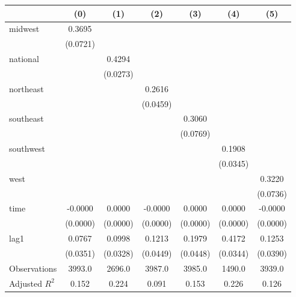 \begin{tabular}{lcccccc}
\toprule
 & (0) & (1) & (2) & (3) & (4) & (5) \\
\midrule
midwest & 0.3695 &  &  &  &  &  \\
\vspace{0.2cm}
 & (0.0721) &  &  &  &  &  \\
national &  & 0.4294 &  &  &  &  \\
\vspace{0.2cm}
 &  & (0.0273) &  &  &  &  \\
northeast &  &  & 0.2616 &  &  &  \\
\vspace{0.2cm}
 &  &  & (0.0459) &  &  &  \\
southeast &  &  &  & 0.3060 &  &  \\
\vspace{0.2cm}
 &  &  &  & (0.0769) &  &  \\
southwest &  &  &  &  & 0.1908 &  \\
\vspace{0.2cm}
 &  &  &  &  & (0.0345) &  \\
west &  &  &  &  &  & 0.3220 \\
\vspace{0.2cm}
 &  &  &  &  &  & (0.0736) \\
time & -0.0000 & 0.0000 & -0.0000 & 0.0000 & 0.0000 & -0.0000 \\
\vspace{0.2cm}
 & (0.0000) & (0.0000) & (0.0000) & (0.0000) & (0.0000) & (0.0000) \\
lag1 & 0.0767 & 0.0998 & 0.1213 & 0.1979 & 0.4172 & 0.1253 \\
\vspace{0.2cm}
 & (0.0351) & (0.0328) & (0.0449) & (0.0448) & (0.0344) & (0.0390) \\
\midrule
Observations & 3993.0 & 2696.0 & 3987.0 & 3985.0 & 1490.0 & 3939.0 \\
Adjusted $R^2$ & 0.152 & 0.224 & 0.091 & 0.153 & 0.226 & 0.126 \\
\bottomrule
\end{tabular}